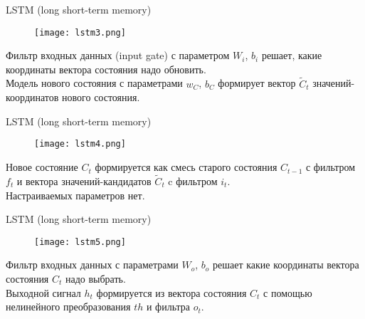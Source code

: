\documentclass[11pt]{beamer}
\begin{document}
 
 	\begin{frame}{LSTM (long short-term memory)}
      	\begin{figure}
	        	\centering
	        	\texttt{[image: lstm3.png]}
	    	\end{figure}
     	Фильтр входных данных (input gate) с параметром $W_i$, $b_i$ решает,
		какие координаты вектора состояния надо обновить.\\
		Модель нового состояния с параметрами $w_C$, $b_C$ формирует вектор $\widetilde{C}_t$ значений-координатов нового состояния.
 	\end{frame}
 
 	\begin{frame}{LSTM (long short-term memory)}
      	\begin{figure}
	        \centering
	        \texttt{[image: lstm4.png]}
	        
	    \end{figure}
    	Новое состояние $C_t$ формируется как смесь старого состояния $C_{t-1}$ с фильтром $f_t$ и вектора значений-кандидатов $\widetilde{C}_t$ c фильтром $i_t$.\\
    	Настраиваемых параметров нет.
 	\end{frame}

 	\begin{frame}{LSTM (long short-term memory)}
      	\begin{figure}
	       	 \centering
	        	\texttt{[image: lstm5.png]}
	        
	    \end{figure}
     	Фильтр входных данных с параметрами $W_o$, $b_o$ решает какие координаты вектора состояния $C_t$ надо выбрать.\\
    	Выходной сигнал $h_t$ формируется из вектора состояния $C_t$ с помощью нелинейного преобразования $th$ и фильтра $o_t$.
 	\end{frame}
\end{document}
